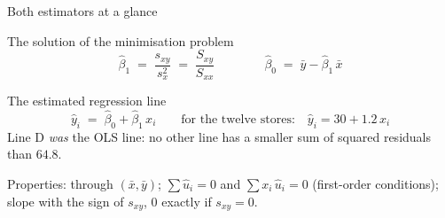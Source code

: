 \documentclass[aspectratio=169,11pt]{beamer}
\begin{document}
\begin{frame}{Both estimators at a glance}
  \begin{block}{The solution of the minimisation problem}
    \[
      \hat{\beta}_1 \;=\; \frac{s_{xy}}{s_x^{2}} \;=\; \frac{S_{xy}}{S_{xx}}
      \qquad\qquad
      \hat{\beta}_0 \;=\; \bar{y} - \hat{\beta}_1\,\bar{x}
    \]
    \vspace{-8pt}
  \end{block}

  \begin{block}{The estimated regression line}
    \[
      \hat{y}_i \;=\; \hat{\beta}_0 + \hat{\beta}_1\, x_i
      \qquad\text{for the twelve stores:}\quad \hat{y}_i = 30 + 1.2\,x_i
    \]
    Line D \emph{was} the OLS line: no other line has a smaller sum of
    squared residuals than $64.8$.
  \end{block}
  \vspace{-5pt}


  \footnotesize Properties: through $(\bar{x},\bar{y})$; $\sum \hat{u}_i = 0$
  and $\sum x_i\,\hat{u}_i = 0$ (first-order conditions); slope with the sign
  of $s_{xy}$, $0$ exactly if $s_{xy} = 0$.
  \hfill\hyperlink{derivation}{}
\end{frame}
\end{document}
